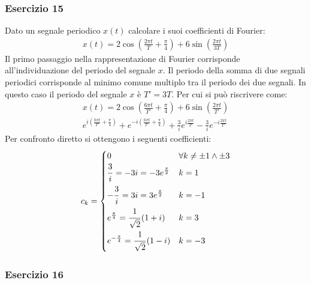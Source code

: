 \documentclass{article}
\newcommand{\Frac}[2]{\displaystyle\frac{\strut{#1}}{\strut{#2}}}
\begin{document}
\subsubsection*{Esercizio 15}

Dato un segnale periodico $x(t)$ calcolare i suoi coefficienti di Fourier:
\begin{gather*}
    x(t)=2\cos\displaystyle\left(\frac{2\pi t}{T}+\frac{\pi}{4}\right)+6\sin\left(\frac{2\pi t}{3T}\right)
\end{gather*}
Il primo passaggio nella rappresentazione di Fourier corrisponde all'individuazione del periodo del segnale $x$. Il periodo della somma di due segnali periodici corrisponde 
al minimo comune multiplo tra il periodo dei due segnali. In questo caso il periodo del segnale $x$ è $T'=3T$. Per cui si può riscrivere come:
\begin{gather*}
    x(t)=\displaystyle2\cos\left(\frac{6\pi t}{T'}+\frac{\pi}{4}\right)+6\sin\left(\frac{2\pi t}{T'}\right)\\
    \displaystyle e^{i\left(\frac{6\pi t}{T'}+\frac{\pi}{4}\right)}+e^{-i\left(\frac{6\pi t}{T'}+\frac{\pi}{4}\right)}+\frac{3}{i}e^{i\frac{2\pi t}{T'}}-\frac{3}{i}e^{-i\frac{2\pi t}{T'}}
\end{gather*} 
Per confronto diretto si ottengono i seguenti coefficienti:
\begin{gather}
    c_k=
    \begin{cases}
        0&\forall k\neq\pm1\land\pm3\\
        \displaystyle\Frac{3}{ i}=-3i=-3e^{\frac{\pi}{2}} &k=1\\
        -\Frac{3}{i}=3i=3e^{\frac{\pi}{2}}&k=-1\\
        \displaystyle e^{\frac{\pi}{4}}=\Frac{1}{\sqrt{2}}(1+i)&k=3\\
        \displaystyle e^{-\frac{\pi}{4}}=\Frac{1}{\sqrt{2}}(1-i)&k=-3
    \end{cases}
\end{gather}

\subsubsection*{Esercizio 16}
\end{document}
